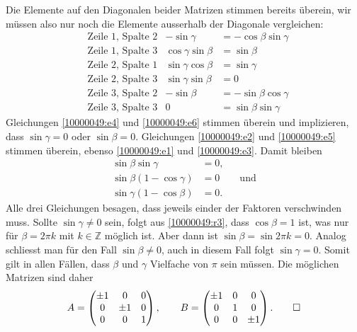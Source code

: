 \begin{loesung}
\begin{teilaufgaben}
Die Elemente auf den Diagonalen beider Matrizen stimmen bereits
überein, wir müssen also nur noch die Elemente ausserhalb der
Diagonale vergleichen:
\begin{align}
&\text{Zeile $1$, Spalte $2$}
&
-\sin\gamma&=-\cos\beta\sin\gamma
\label{10000049:e1}
\\
&\text{Zeile $1$, Spalte $3$}
&
\cos\gamma\sin\beta&=\sin\beta
\label{10000049:e2}
\\
&\text{Zeile $2$, Spalte $1$}
&
\sin\gamma\cos\beta&=\sin\gamma
\label{10000049:e3}
\\
&\text{Zeile $2$, Spalte $3$}
&
\sin\gamma\sin\beta&=0
\label{10000049:e4}
\\
&\text{Zeile $3$, Spalte $2$}
&
-\sin\beta&=-\sin\beta\cos\gamma
\label{10000049:e5}
\\
&\text{Zeile $3$, Spalte $3$}
&
0&=\sin\beta\sin\gamma
\label{10000049:e6}
\end{align}
Gleichungen
\eqref{10000049:e4}
und
\eqref{10000049:e6}
stimmen überein und implizieren, dass $\sin\gamma=0$ oder $\sin\beta=0$.
Gleichungen
\eqref{10000049:e2}
und
\eqref{10000049:e5}
stimmen überein, ebenso
\eqref{10000049:e1}
und
\eqref{10000049:e3}.
Damit bleiben
\begin{align}
\sin\beta   \sin\gamma &=0, \label{10000049:r1}\\
\sin\beta(1-\cos\gamma)&=0\qquad\text{und} \label{10000049:r2}\\
\sin\gamma(1-\cos\beta)&=0.\label{10000049:r3}
\end{align}
Alle drei Gleichungen besagen, dass jeweils einder der Faktoren verschwinden
muss.
Sollte $\sin\gamma\ne0$ sein, folgt aus \eqref{10000049:r3}, dass $\cos\beta=1$
ist, was nur für $\beta=2\pi k$ mit $k\in\mathbb Z$ möglich ist.
Aber dann ist $\sin\beta=\sin 2\pi k=0$.
Analog schliesst man für den Fall $\sin\beta\ne 0$, auch in diesem Fall folgt
$\sin\gamma=0$.
Somit gilt in allen Fällen, dass $\beta$ und $\gamma$ Vielfache von
$\pi$ sein müssen.
Die möglichen Matrizen sind daher
\[
A=\begin{pmatrix}
\pm1&   0&0\\
   0&\pm1&0\\
   0&   0&1
\end{pmatrix},
\qquad
B=\begin{pmatrix}
\pm1&0&   0\\
   0&1&   0\\
   0&0&\pm1
\end{pmatrix}.
\qedhere
\]
\end{teilaufgaben}
\end{loesung}


